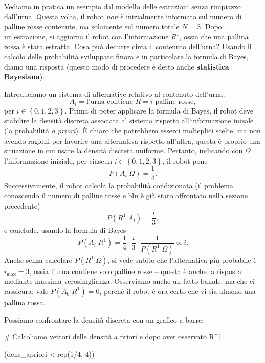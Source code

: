 \documentclass[
  italian,
  letterpaper,
]{book}
\newenvironment{Shaded}{\begin{snugshade}}{\end{snugshade}}
\newcommand{\CommentTok}[1]{\textcolor[rgb]{0.37,0.37,0.37}{#1}}
\newcommand{\DecValTok}[1]{\textcolor[rgb]{0.68,0.00,0.00}{#1}}
\newcommand{\FunctionTok}[1]{\textcolor[rgb]{0.28,0.35,0.67}{#1}}
\newcommand{\NormalTok}[1]{\textcolor[rgb]{0.00,0.23,0.31}{#1}}
\newcommand{\OtherTok}[1]{\textcolor[rgb]{0.00,0.23,0.31}{#1}}
\newcommand{\SpecialCharTok}[1]{\textcolor[rgb]{0.37,0.37,0.37}{#1}}
\newcommand{\cur}[1]{\left\{ #1 \right\}}
\theoremstyle{definition}
\theoremstyle{remark}
\begin{document}
Vediamo in pratica un esempio dal modello delle estrazioni senza
rimpiazzo dall'urna. Questa volta, il robot \emph{non} è inizialmente
informato sul numero di palline rosse contenute, ma solamente sul numero
totale \(N=3\). Dopo un'estrazione, si aggiorna il robot con
l'informazione \(R^1\), ossia che una pallina rossa è stata estratta.
Cosa può dedurre circa il contenuto dell'urna? Usando il calcolo delle
probabilità sviluppato finora e in particolare la formula di Bayes,
diamo una risposta (questo modo di procedere è detto anche
\textbf{statistica Bayesiana}).

Introduciamo un sistema di alternative relativo al contenuto dell'urna:
\[ A_i = \text{l'urna contiene $R=i$ palline rosse}, \] per
\(i \in \cur{0,1, 2, 3}\). Prima di poter applicare la formula di Bayes,
il robot deve stabilire la densità discreta associata al sistema
rispetto all'informazione inizale (la probabilità \emph{a priori}). È
chiaro che potrebbero esserci molteplici scelte, ma non avendo ragioni
per favorire una alternativa rispetto all'altra, questa è proprio una
situazione in cui usare la densità discreta uniforme. Pertanto,
indicando con \(\Omega\) l'informazione iniziale, per ciascun
\(i\in \cur{0,1,2,3}\), il robot pone \[ P(A_i | \Omega) = \frac 1 4.\]
Successivamente, il robot calcola la probabilità condizionata (il
problema conoscendo il numero di palline rosse e blu è già stato
affrontato nella sezione precedente) \[ P( R^1 | A_i) = \frac{i}{3},\] e
conclude, usando la formula di Bayes
\[ P(A_i | R^1 ) = \frac{1}{4} \cdot \frac{i}{3} \cdot \frac{1}{P(R^1|\Omega)} \propto i.\]
Anche senza calcolare \(P(R^1|\Omega)\), si vede subito che
l'alternativa più probabile è \(i_{\max} = 3\), ossia l'urna contiene
solo palline rosse -- questa è anche la risposta mediante massima
verosimglianza. Osserviamo anche un fatto banale, ma che ci rassicura:
vale \(P(A_0 | R^1) = 0\), perché il robot è ora certo che vi sia almeno
una pallina rossa.

Possiamo confrontare la densità discreta con un grafico a barre:

\begin{Shaded}
\begin{Highlighting}[]
\CommentTok{\# Calcoliamo vettori delle densità a priori e dopo aver osservato R\^{}1}

\NormalTok{(dens\_apriori }\OtherTok{\textless{}{-}}\FunctionTok{rep}\NormalTok{(}\DecValTok{1}\SpecialCharTok{/}\DecValTok{4}\NormalTok{, }\DecValTok{4}\NormalTok{))}
\end{Highlighting}
\end{Shaded}
\end{document}
